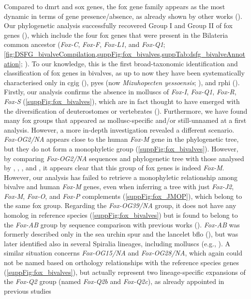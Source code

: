 Compared to \gls{dmrt} and \gls{sox} genes, the \gls{fox} gene family appears as the most dynamic in terms of gene presence/absence, as already shown by other works (). Our phylogenetic analysis successfully recovered Group I and Group II of \gls{fox} genes (), which include the four \gls{fox} genes that were present in the Bilateria common ancestor (\textit{Fox-C}, \textit{Fox-F}, \textit{Fox-L1}, and \textit{Fox-Q1}; \cref{fig:DSFG_bivalveCompilation,suppFig:fox_bivalves,suppTab:dsfg_bivalveAnnotation}; \cite{shimeld2010clustered}). To our knowledge, this is the first broad-taxonomic identification and classification of \gls{fox} genes in bivalves, as up to now they have been systematically characterised only in \gls{cgig} (), \gls{pyes} (now \textit{Mizuhopecten yessoensis}; ), and \gls{rphi} (). Firstly, our analysis confirms the absence in molluscs of \textit{Fox-I}, \textit{Fox-Q1}, \textit{Fox-R}, \textit{Fox-S} (\cref{suppFig:fox_bivalves}), which are in fact thought to have emerged with the diversification of deuterostomes or vertebrates (). Furthermore, we have found many \gls{fox} groups that appeared as mollusc-specific and/or still-unnamed at a first analysis. However, a more in-depth investigation revealed a different scenario. \textit{Fox-OG2/NA} appears close to the human \textit{Fox-M} gene in the phylogenetic tree, but they do not form a monophyletic group (\cref{suppFig:fox_bivalves}). However, by comparing \textit{Fox-OG2/NA} sequences and phylogenetic tree with those analysed by , , , and , it appears clear that this group of \gls{fox} genes is indeed \textit{Fox-M}. However, our analysis has failed to retrieve a monophyletic relationship among bivalve and human \textit{Fox-M} genes, even when inferring a tree with just \textit{Fox-J2}, \textit{Fox-M}, \textit{Fox-O}, and \textit{Fox-P} complements (\cref{suppFig:fox_JMOP}), which belong to the same \gls{fox} group. Regarding the \textit{Fox-OG39/NA} group, it does not have any homolog in reference species (\cref{suppFig:fox_bivalves}) but is found to belong to the \textit{Fox-AB} group by sequence comparison with previous works (). \textit{Fox-AB} was formerly described only in the sea urchin \gls{spur} and the lancelet \gls{bflo} (), but was later identified also in several Spiralia lineages, including molluscs (e.g., ). A similar situation concerns \textit{Fox-OG15/NA} and \textit{Fox-OG28/NA}, which again could not be named based on orthology relationships with the reference species genes (\cref{suppFig:fox_bivalves}), but actually represent two lineage-specific expansions of the \textit{Fox-Q2} group (named \textit{Fox-Q2b} and \textit{Fox-Q2c}), as already appointed in previous studies 